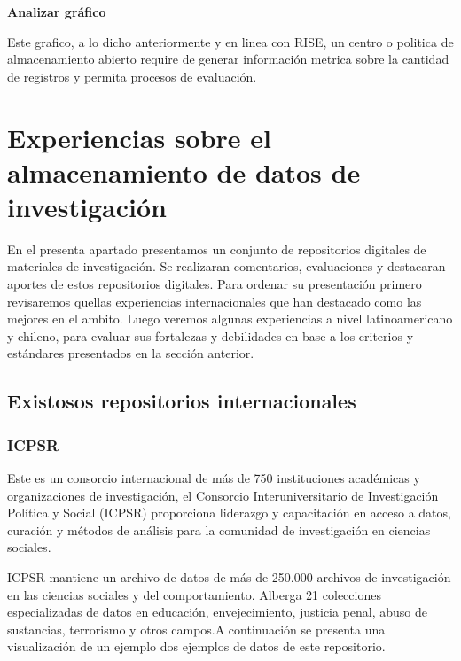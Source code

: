 \documentclass[
  14pt,
]{book}
\begin{document}
\textbf{Analizar gráfico}

Este grafico, a lo dicho anteriormente y en linea con RISE, un centro o politica de almacenamiento abierto require de generar información metrica sobre la cantidad de registros y permita procesos de evaluación.

\hypertarget{experiencias-sobre-el-almacenamiento-de-datos-de-investigaciuxf3n}{%
\chapter{Experiencias sobre el almacenamiento de datos de investigación}\label{experiencias-sobre-el-almacenamiento-de-datos-de-investigaciuxf3n}}

En el presenta apartado presentamos un conjunto de repositorios digitales de materiales de investigación. Se realizaran comentarios, evaluaciones y destacaran aportes de estos repositorios digitales. Para ordenar su presentación primero revisaremos quellas experiencias internacionales que han destacado como las mejores en el ambito. Luego veremos algunas experiencias a nivel latinoamericano y chileno, para evaluar sus fortalezas y debilidades en base a los criterios y estándares presentados en la sección anterior.

\hypertarget{existosos-repositorios-internacionales}{%
\section{Existosos repositorios internacionales}\label{existosos-repositorios-internacionales}}

\hypertarget{icpsr}{%
\subsection{ICPSR}\label{icpsr}}

Este es un consorcio internacional de más de 750 instituciones académicas y organizaciones de investigación, el Consorcio Interuniversitario de Investigación Política y Social (ICPSR) proporciona liderazgo y capacitación en acceso a datos, curación y métodos de análisis para la comunidad de investigación en ciencias sociales.

ICPSR mantiene un archivo de datos de más de 250.000 archivos de investigación en las ciencias sociales y del comportamiento. Alberga 21 colecciones especializadas de datos en educación, envejecimiento, justicia penal, abuso de sustancias, terrorismo y otros campos.A continuación se presenta una visualización de un ejemplo dos ejemplos de datos de este repositorio.
\end{document}
